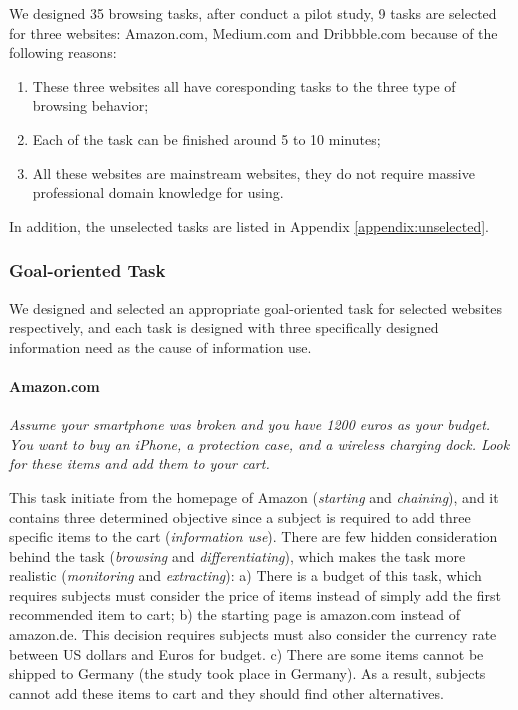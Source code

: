 We designed 35 browsing tasks, after conduct a pilot study, 
9 tasks are selected for three websites: Amazon.com, Medium.com and Dribbble.com 
because of the following reasons:

\begin{enumerate}
    \item These three websites all have coresponding tasks to the three type of browsing behavior;
    \item Each of the task can be finished around 5 to 10 minutes;
    \item All these websites are mainstream websites, they do not require 
        massive professional domain knowledge for using.
\end{enumerate}

In addition, the unselected tasks are listed in Appendix \ref{appendix:unselected}.

\subsubsection{Goal-oriented Task}

We designed and selected an appropriate goal-oriented task for selected websites respectively,
and each task is designed with three specifically designed information need as
the cause of information use.

\paragraph{Amazon.com} \emph{Assume your smartphone was broken and you have 1200 euros 
    as your budget. You want to buy an iPhone, a protection case, and a wireless 
    charging dock. Look for these items and add them to your cart.}

This task initiate from the homepage of Amazon (\emph{starting} and \emph{chaining}), 
and it contains three determined objective since 
a subject is required to add three specific items to the cart (\emph{information use}). 
There are few hidden consideration behind the task (\emph{browsing} and \emph{differentiating}),
which makes the task more realistic (\emph{monitoring} and \emph{extracting}): 
a) There is a budget of this task, which requires subjects must consider the
price of items instead of simply add the first recommended item to cart; 
b) the starting page is amazon.com instead of amazon.de. This decision requires
subjects must also consider the currency rate between US dollars and Euros for budget.
c) There are some items cannot be shipped to Germany (the study took place in Germany).
As a result, subjects cannot add these items to cart and they should find other alternatives.

